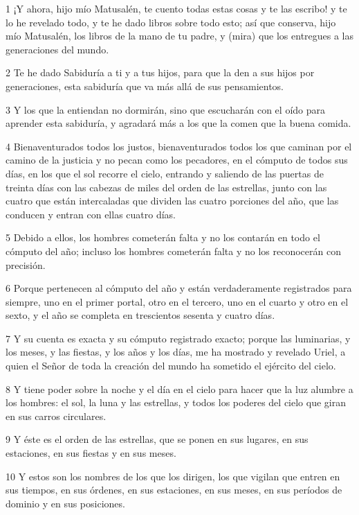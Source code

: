 \par 1 ¡Y ahora, hijo mío Matusalén, te cuento todas estas cosas y te las escribo! y te lo he revelado todo, y te he dado libros sobre todo esto; así que conserva, hijo mío Matusalén, los libros de la mano de tu padre, y (mira) que los entregues a las generaciones del mundo.
\par 2 Te he dado Sabiduría a ti y a tus hijos, para que la den a sus hijos por generaciones, esta sabiduría que va más allá de sus pensamientos.
\par 3 Y los que la entiendan no dormirán, sino que escucharán con el oído para aprender esta sabiduría, y agradará más a los que la comen que la buena comida.
\par 4 Bienaventurados todos los justos, bienaventurados todos los que caminan por el camino de la justicia y no pecan como los pecadores, en el cómputo de todos sus días, en los que el sol recorre el cielo, entrando y saliendo de las puertas de treinta días con las cabezas de miles del orden de las estrellas, junto con las cuatro que están intercaladas que dividen las cuatro porciones del año, que las conducen y entran con ellas cuatro días.
\par 5 Debido a ellos, los hombres cometerán falta y no los contarán en todo el cómputo del año; incluso los hombres cometerán falta y no los reconocerán con precisión.
\par 6 Porque pertenecen al cómputo del año y están verdaderamente registrados para siempre, uno en el primer portal, otro en el tercero, uno en el cuarto y otro en el sexto, y el año se completa en trescientos sesenta y cuatro días.
\par 7 Y su cuenta es exacta y su cómputo registrado exacto; porque las luminarias, y los meses, y las fiestas, y los años y los días, me ha mostrado y revelado Uriel, a quien el Señor de toda la creación del mundo ha sometido el ejército del cielo.
\par 8 Y tiene poder sobre la noche y el día en el cielo para hacer que la luz alumbre a los hombres: el sol, la luna y las estrellas, y todos los poderes del cielo que giran en sus carros circulares.
\par 9 Y éste es el orden de las estrellas, que se ponen en sus lugares, en sus estaciones, en sus fiestas y en sus meses.
\par 10 Y estos son los nombres de los que los dirigen, los que vigilan que entren en sus tiempos, en sus órdenes, en sus estaciones, en sus meses, en sus períodos de dominio y en sus posiciones.
